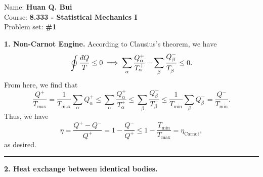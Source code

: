 \documentclass{article}
\theoremstyle{definition}
\newcommand{\al}{\alpha}
\newcommand{\be}{\beta}
\def\dbar{{\mkern3mu\mathchar'26\mkern-12mu   d}}
\newcommand{\f}[2]{\frac{#1}{#2}}
\begin{document}
		\begin{framed}
			\noindent Name: \textbf{Huan Q. Bui}\\
			Course: \textbf{8.333 - Statistical Mechanics I}\\
			Problem set: \textbf{\#1}
		\end{framed}
	
\noindent \textbf{1. Non-Carnot Engine.} According to Clausius's theorem, we have
\begin{equation*}
\oint \f{\dbar Q}{T} \leq 0 \implies  \sum_\al \f{Q_\al^+}{T_\al^+} - \sum_\be \f{Q_\be^-}{T_\be^-} \leq 0.
\end{equation*} 
From here, we find that
\begin{equation*}
\f{Q^+}{T_\text{max}}  = \f{1}{T_\text{max}} \sum_\al Q_\al^+ \leq  \sum_\al \f{Q_\al^+}{T_\al^+} \leq \sum_\be \f{Q_\be^-}{T_\be^-} \leq \f{1}{T_\text{min}}\sum_\be Q_\be^- = \f{Q^-}{T_\text{min}}.
\end{equation*}
Thus, we have
\begin{equation*}
\eta = \f{Q^+ - Q^-}{Q^+} = 1 - \f{Q^-}{Q^+} \leq 1 - \f{T_\text{min}}{T_\text{max}} =   \eta_\text{Carnot},
\end{equation*}
as desired. \\


\hrule

$\,$\\




\noindent \textbf{2. Heat exchange between identical bodies.}
\end{document}
